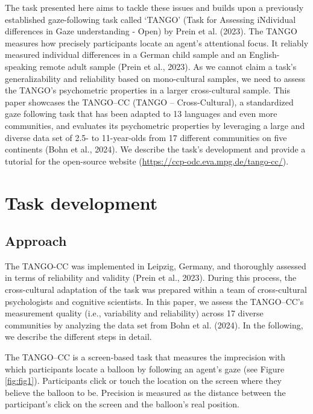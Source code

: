 \documentclass[
  man,floatsintext]{apa7}
\begin{document}
The task presented here aims to tackle these issues and builds upon a previously established gaze-following task called `TANGO' (Task for Assessing iNdividual differences in Gaze understanding - Open) by Prein et al. (2023).
The TANGO measures how precisely participants locate an agent's attentional focus.
It reliably measured individual differences in a German child sample and an English-speaking remote adult sample (Prein et al., 2023).
As we cannot claim a task's generalizability and reliability based on mono-cultural samples, we need to assess the TANGO's psychometric properties in a larger cross-cultural sample.
This paper showcases the TANGO--CC (TANGO -- Cross-Cultural), a standardized gaze following task that has been adapted to 13 languages and even more communities, and evaluates its psychometric properties by leveraging a large and diverse data set of 2.5- to 11-year-olds from 17 different communities on five continents (Bohn et al., 2024).
We describe the task's development and provide a tutorial for the open-source website (\url{https://ccp-odc.eva.mpg.de/tango-cc/}).

\section{Task development}\label{task-development}

\subsection{Approach}\label{approach}

The TANGO-CC was implemented in Leipzig, Germany, and thoroughly assessed in terms of reliability and validity (Prein et al., 2023).
During this process, the cross-cultural adaptation of the task was prepared within a team of cross-cultural psychologists and cognitive scientists.
In this paper, we assess the TANGO--CC's measurement quality (i.e., variability and reliability) across 17 diverse communities by analyzing the data set from Bohn et al. (2024).
In the following, we describe the different steps in detail.

The TANGO--CC is a screen-based task that measures the imprecision with which participants locate a balloon by following an agent's gaze (see Figure \ref{fig:fig1}).
Participants click or touch the location on the screen where they believe the balloon to be.
Precision is measured as the distance between the participant's click on the screen and the balloon's real position.
\end{document}
